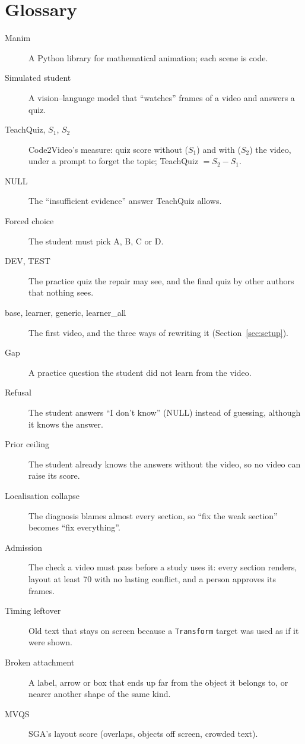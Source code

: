 \documentclass[11pt]{article}
\begin{document}
\section*{Glossary}
\begin{description}
  \item[Manim] A Python library for mathematical animation; each scene is code.
  \item[Simulated student] A vision--language model that ``watches'' frames of a video and answers a quiz.
  \item[TeachQuiz, $S_1$, $S_2$] Code2Video's measure: quiz score without ($S_1$) and with ($S_2$) the video, under a
  prompt to forget the topic; TeachQuiz $= S_2 - S_1$.
  \item[NULL] The ``insufficient evidence'' answer TeachQuiz allows.
  \item[Forced choice] The student must pick A, B, C or D.
  \item[DEV, TEST] The practice quiz the repair may see, and the final quiz by other authors that nothing sees.
  \item[base, learner, generic, learner\_all] The first video, and the three ways of rewriting it
  (Section~\ref{sec:setup}).
  \item[Gap] A practice question the student did not learn from the video.
  \item[Refusal] The student answers ``I don't know'' (NULL) instead of guessing, although it knows the answer.
  \item[Prior ceiling] The student already knows the answers without the video, so no video can raise its score.
  \item[Localisation collapse] The diagnosis blames almost every section, so ``fix the weak section'' becomes ``fix
  everything''.
  \item[Admission] The check a video must pass before a study uses it: every section renders, layout at least 70 with
  no lasting conflict, and a person approves its frames.
  \item[Timing leftover] Old text that stays on screen because a \texttt{Transform} target was used as if it were
  shown.
  \item[Broken attachment] A label, arrow or box that ends up far from the object it belongs to, or nearer another
  shape of the same kind.
  \item[MVQS] SGA's layout score (overlaps, objects off screen, crowded text).

\end{description}
\end{document}
